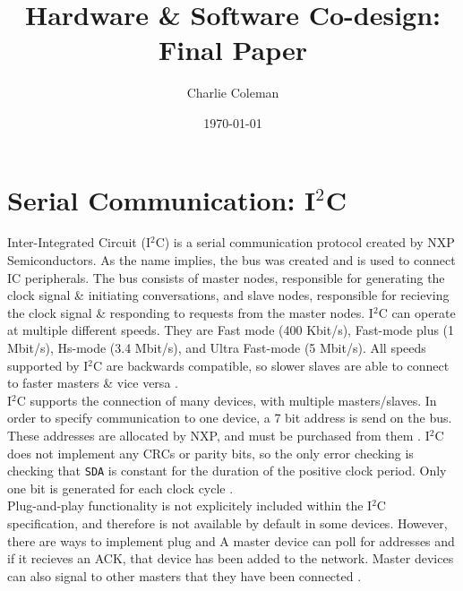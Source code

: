 \documentclass[12pt]{article}
\title{Hardware \& Software Co-design: Final Paper}
\author{Charlie Coleman}
\date{\today}
\newcommand{\itc}{I$^2$C}
\begin{document}
	\maketitle
	
	\section{Serial Communication: \itc}
	
	Inter-Integrated Circuit (\itc) is a serial communication protocol created by NXP Semiconductors. As the name implies, the bus was created and is used to connect IC peripherals. The bus consists of master nodes, responsible for generating the clock signal \& initiating conversations, and slave nodes, responsible for recieving the clock signal \& responding to requests from the master nodes. \itc{} can operate at multiple different speeds. They are Fast mode (400 Kbit/s), Fast-mode plus (1 Mbit/s), Hs-mode (3.4 Mbit/s), and Ultra Fast-mode (5 Mbit/s). All speeds supported by \itc{} are backwards compatible, so slower slaves are able to connect to faster masters \& vice versa \autocite{i2cspec}.\\
	
	\itc{} supports the connection of many devices, with multiple masters/slaves. In order to specify communication to one device, a 7 bit address is send on the bus. These addresses are allocated by NXP, and must be purchased from them \autocite{i2clicense}. \itc{} does not implement any CRCs or parity bits, so the only error checking is checking that \texttt{SDA} is constant for the duration of the positive clock period. Only one bit is generated for each clock cycle \autocite{i2cspec}.\\
	
	Plug-and-play functionality is not explicitely included within the \itc{} specification, and therefore is not available by default in some devices. However, there are ways to implement plug and A master device can poll for addresses and if it recieves an ACK, that device has been added to the network. Master devices can also signal to other masters that they have been connected \autocite{i2clicense}.
	
\end{document}
